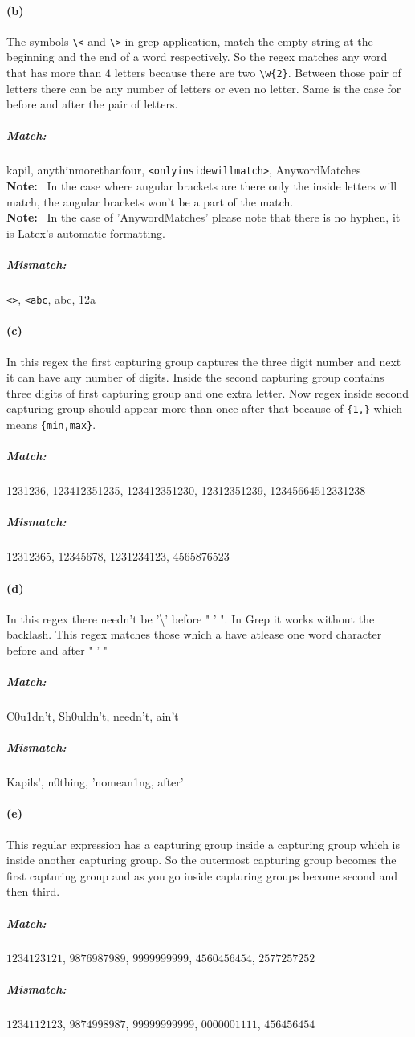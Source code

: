 \documentclass[12]{article}
\begin{document}
\paragraph*{(b)}
The symbols \verb|\<| and \verb|\>| in grep application, match the empty string at the beginning and the end of a word respectively. So the regex matches any word that has more than $4$ letters because there are two \verb|\w{2}|. Between those pair of letters there can be any number of letters or even no letter. Same is the case for before and after the pair of letters.
\subparagraph*{Match:}
kapil, anythinmorethanfour, \verb|<onlyinsidewillmatch>|, AnywordMatches
\\
\textbf{Note:} \ In the case where angular brackets are there only the inside letters will match, the angular brackets won't be a part of the match.\\
\textbf{Note:} \ In the case of 'AnywordMatches' please note that there is no hyphen, it is Latex's automatic formatting.
\subparagraph*{Mismatch:}
\verb|<>|, \verb|<abc|, abc, 12a

\paragraph*{(c)}
In this regex the first capturing group captures the three digit number and next it can have any number of digits. Inside the second capturing group contains three digits of first capturing group and one extra letter. Now regex inside second capturing group should appear more than once after that because of \verb|{1,}| which means \verb|{min,max}|.
\subparagraph*{Match:}
1231236, 123412351235, 123412351230, 12312351239, 12345664512331238
\subparagraph*{Mismatch:}
12312365, 12345678, 1231234123, 4565876523

\paragraph*{(d)}
In this regex there needn't be '\textbackslash' before " ' ". In Grep it works without the backlash.
This regex matches those which a have atlease one word character before and after " ' "
\subparagraph*{Match:}
C0u1dn't, Sh0uldn't, needn't, ain't
\subparagraph*{Mismatch:}
Kapils', n0thing, 'nomean1ng, after'

\paragraph*{(e)}
This regular expression has a capturing group inside a capturing group which is inside another capturing group. So the outermost capturing group becomes the first capturing group and as you go inside capturing groups become second and then third.	
\subparagraph*{Match:} 
$1234123121$, $9876987989$, $9999999999$, $4560456454$, $2577257252$ 
\subparagraph*{Mismatch:}
$1234112123$, $9874998987$, $99999999999$, $0000001111$, $456456454$
\end{document}
